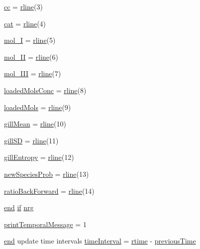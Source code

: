 \begin{DoxyCompactItemize}
\hyperlink{a00028_afb5980388a6e55ca55437b53cdaf528a}{cc} = \hyperlink{a00028_ab5b947e1a8b7cf496ffd4eb21317052e}{rline}(3)
\item 
\hyperlink{a00028_a7073f71a43389f3032e69b1fffc2551a}{cat} = \hyperlink{a00028_ab5b947e1a8b7cf496ffd4eb21317052e}{rline}(4)
\item 
\hyperlink{a00028_aa34a234182765424bb00fc9fa273a9af}{mol\-\_\-\-I} = \hyperlink{a00028_ab5b947e1a8b7cf496ffd4eb21317052e}{rline}(5)
\item 
\hyperlink{a00028_a4f157720ec2d86dca3cf99f650dc5777}{mol\-\_\-\-I\-I} = \hyperlink{a00028_ab5b947e1a8b7cf496ffd4eb21317052e}{rline}(6)
\item 
\hyperlink{a00028_adf61c91ad9a34233b3fe493e21f8969e}{mol\-\_\-\-I\-I\-I} = \hyperlink{a00028_ab5b947e1a8b7cf496ffd4eb21317052e}{rline}(7)
\item 
\hyperlink{a00028_a96e1a3cfb8478cba3fec1e7a5839bb44}{loaded\-Mols\-Conc} = \hyperlink{a00028_ab5b947e1a8b7cf496ffd4eb21317052e}{rline}(8)
\item 
\hyperlink{a00028_a9ec42402ca3b08b7f3f2b602e1e2f3b0}{loaded\-Mols} = \hyperlink{a00028_ab5b947e1a8b7cf496ffd4eb21317052e}{rline}(9)
\item 
\hyperlink{a00028_a7d36858faf2f8bb5963306c86db2b549}{gill\-Mean} = \hyperlink{a00028_ab5b947e1a8b7cf496ffd4eb21317052e}{rline}(10)
\item 
\hyperlink{a00028_a187931f510c22818692d094c8026ebd1}{gill\-S\-D} = \hyperlink{a00028_ab5b947e1a8b7cf496ffd4eb21317052e}{rline}(11)
\item 
\hyperlink{a00028_aef2e92fdea881fe7819bf51b2d7e0783}{gill\-Entropy} = \hyperlink{a00028_ab5b947e1a8b7cf496ffd4eb21317052e}{rline}(12)
\item 
\hyperlink{a00028_aa66147edba72bc0b9cf591cd7475396f}{new\-Species\-Prob} = \hyperlink{a00028_ab5b947e1a8b7cf496ffd4eb21317052e}{rline}(13)
\item 
\hyperlink{a00028_a32ac1074f1b1cce044e95ec345f378e7}{ratio\-Back\-Forward} = \hyperlink{a00028_ab5b947e1a8b7cf496ffd4eb21317052e}{rline}(14)
\item 
\hyperlink{a00025_afb358f48b1646c750fb9da6c6585be2b}{end} \hyperlink{a00030_a01d55766b8058903dd360b4bda71f9f5}{if} \hyperlink{a00028_af837f695e5b67c86016c1a82608c38b4}{nrg}
\item 
\hyperlink{a00028_acc16e80f122cc11cf1570c53597afb19}{print\-Temporal\-Message} = 1
\item 
\hyperlink{a00025_afb358f48b1646c750fb9da6c6585be2b}{end} update time intervals \hyperlink{a00028_a30a404fc0b2d3c996251dfd4adf5ec51}{time\-Interval} = \hyperlink{a00028_afc6b38657a313b9f1de2ee356910b6ee}{rtime} -\/ \hyperlink{a00028_a17b8652a085b5add031a40fb1c9a680e}{previous\-Time}

\end{DoxyCompactItemize}

